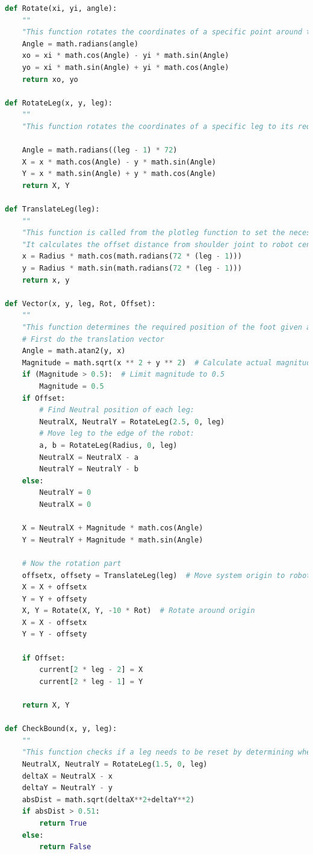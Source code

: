 \begin{lstlisting}[language = python]
def Rotate(xi, yi, angle):
    ""
    "This function rotates the coordinates of a specific point around the origin by a certain angle(degrees)"
    Angle = math.radians(angle)
    xo = xi * math.cos(Angle) - yi * math.sin(Angle)
    yo = xi * math.sin(Angle) + yi * math.cos(Angle)
    return xo, yo

def RotateLeg(x, y, leg):
    ""
    "This function rotates the coordinates of a specific leg to its required position"

    Angle = math.radians((leg - 1) * 72)
    X = x * math.cos(Angle) - y * math.sin(Angle)
    Y = x * math.sin(Angle) + y * math.cos(Angle)
    return X, Y

def TranslateLeg(leg):
    ""
    "This function is called from the plotleg function to set the necessary offsets for plotting."
    "It calculates the offset distance from shoulder joint to robot centre"
    x = Radius * math.cos(math.radians(72 * (leg - 1)))
    y = Radius * math.sin(math.radians(72 * (leg - 1)))
    return x, y

def Vector(x, y, leg, Rot, Offset):
    ""
    "This function determines the required position of the foot given a specific vector and rotation"
    # First do the translation vector
    Angle = math.atan2(y, x)
    Magnitude = math.sqrt(x ** 2 + y ** 2)  # Calculate actual magnitude
    if (Magnitude > 0.5):  # Limit magnitude to 0.5
        Magnitude = 0.5
    if Offset:
        # Find Neutral position of each leg:
        NeutralX, NeutralY = RotateLeg(2.5, 0, leg)
        # Move leg to the edge of the robot:
        a, b = RotateLeg(Radius, 0, leg)
        NeutralX = NeutralX - a
        NeutralY = NeutralY - b
    else:
        NeutralY = 0
        NeutralX = 0

    X = NeutralX + Magnitude * math.cos(Angle)
    Y = NeutralY + Magnitude * math.sin(Angle)

    # Now the rotation part
    offsetx, offsety = TranslateLeg(leg)  # Move system origin to robot center
    X = X + offsetx
    Y = Y + offsety
    X, Y = Rotate(X, Y, -10 * Rot)  # Rotate around origin
    X = X - offsetx
    Y = Y - offsety

    if Offset:
        current[2 * leg - 2] = X
        current[2 * leg - 1] = Y

    return X, Y

def CheckBound(x, y, leg):
    ""
    "This function checks if a leg needs to be reset by determining whether it is within range from its neutral position"
    NeutralX, NeutralY = RotateLeg(1.5, 0, leg)
    deltaX = NeutralX - x
    deltaY = NeutralY - y
    absDist = math.sqrt(deltaX**2+deltaY**2)
    if absDist > 0.51:
        return True
    else:
        return False


\end{lstlisting}
